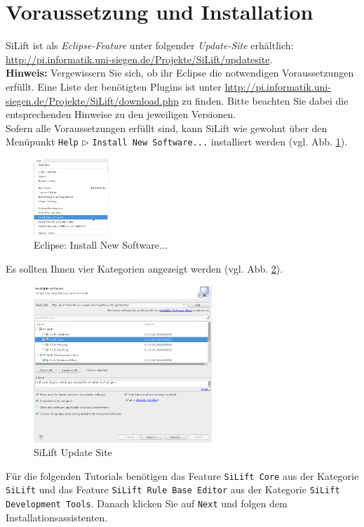 \section{Voraussetzung und Installation}

SiLift ist als \textit{Eclipse-Feature} unter folgender \textit{Update-Site} erhältlich:\\ \url{http://pi.informatik.uni-siegen.de/Projekte/SiLift/updatesite}.\\


\textbf{Hinweis:} Vergewissern Sie sich, ob ihr Eclipse die notwendigen Voraussetzungen erfüllt. 
Eine Liste der benötigten Plugins ist unter \url{http://pi.informatik.uni-siegen.de/Projekte/SiLift/download.php} zu finden.
Bitte beachten Sie dabei die entsprechenden Hinweise zu den jeweiligen Versionen.\\


Sofern alle Voraussetzungen erfüllt sind, kann SiLift wie gewohnt über den Menüpunkt \texttt{Help} $\triangleright$ \texttt{Install New Software...} installiert werden (vgl. Abb. \ref{eclipse-install_new_software}).

\begin{figure}[H]
\centering
\includegraphics[width=0.25\textwidth]{requirements/graphics/eclipse-install_new_software.png}
\caption{Eclipse: Install New Software...}
\label{eclipse-install_new_software}
\end{figure}

Es sollten Ihnen vier Kategorien angezeigt werden (vgl. Abb. \ref{eclipse-install_silift}). 

\begin{figure}[H]
\centering
\includegraphics[width=0.6\textwidth]{requirements/graphics/eclipse-install_silift.png}
\caption{SiLift Update Site}
\label{eclipse-install_silift}
\end{figure}

Für die folgenden Tutorials benötigen das Feature \texttt{SiLift Core} aus der Kategorie \texttt{SiLift} und das Feature \texttt{SiLift Rule Base Editor} aus der Kategorie \texttt{SiLift Development Tools}. Danach klicken Sie auf \texttt{Next} und folgen dem Installationsassistenten.
